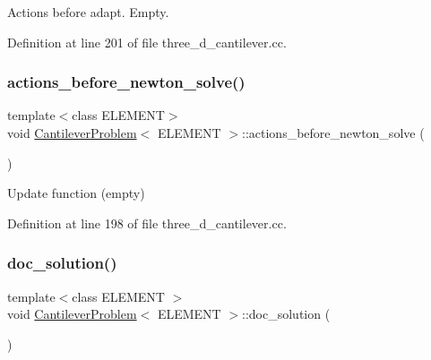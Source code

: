 Actions before adapt. Empty. 



Definition at line 201 of file three\+\_\+d\+\_\+cantilever.\+cc.

\mbox{\label{classCantileverProblem_a293902b825898ce043ffce3f0691f5a5}} 
\subsubsection{\texorpdfstring{actions\+\_\+before\+\_\+newton\+\_\+solve()}{actions\_before\_newton\_solve()}}
{\footnotesize\ttfamily template$<$class E\+L\+E\+M\+E\+NT$>$ \\
void \hyperlink{classCantileverProblem}{Cantilever\+Problem}$<$ E\+L\+E\+M\+E\+NT $>$\+::actions\+\_\+before\+\_\+newton\+\_\+solve (\begin{DoxyParamCaption}{ }\end{DoxyParamCaption})\hspace{0.3cm}{\ttfamily [inline]}}



Update function (empty) 



Definition at line 198 of file three\+\_\+d\+\_\+cantilever.\+cc.

\mbox{\label{classCantileverProblem_a7571348f8724e71be4e67dc64cea3877}} 
\subsubsection{\texorpdfstring{doc\+\_\+solution()}{doc\_solution()}}
{\footnotesize\ttfamily template$<$class E\+L\+E\+M\+E\+NT $>$ \\
void \hyperlink{classCantileverProblem}{Cantilever\+Problem}$<$ E\+L\+E\+M\+E\+NT $>$\+::doc\+\_\+solution (\begin{DoxyParamCaption}{ }\end{DoxyParamCaption})}



